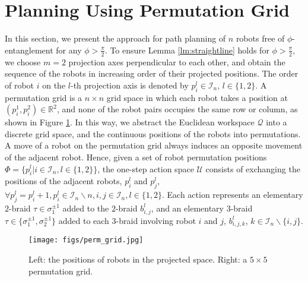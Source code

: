 \documentclass[conference]{IEEEtran}
\newcommand*{\myset}[1]{\mathcal{#1}} %
\newcommand*{\workspace}{\myset{Q}} %
\newcommand*{\rtwo}{\mathbb{R}^2}
\newcommand*{\rone}{\mathbb{R}}
\newcommand*{\btau}{\tau} %
\newcommand*{\bgen}{\sigma} %
\newcommand*{\word}{b} %
\newcommand*{\entangle}{\gamma} %
\newcommand*{\entangledef}{\phi} %
\newcommand*{\dummyl}{l}
\newcommand*{\permpos}{p}
\newcommand*{\permposset}{\Phi}
\newcommand*{\permactionset}{\myset{U}}
\begin{document}
\section{Planning Using Permutation Grid}\label{sec:planning}
In this section, we present the approach for path planning of $n$ robots free of $\entangledef$-entanglement for any $\entangledef>\frac{\pi}{2}$.
To ensure Lemma \ref{lm:straightline} holds for $\entangledef>\frac{\pi}{2}$, we choose $m=2$ projection axes perpendicular to each other, and obtain the sequence of the robots in increasing order of their projected positions.
The order of robot $i$ on the $\dummyl$-th projection axis is denoted by $\permpos_i^\dummyl\in\myset{I}_n$, $\dummyl\in\{1,2\}$.
A permutation grid is a $n\times n$ grid space in which each robot takes a position at $(\permpos_i^1,\permpos_i^2)\in\rtwo$,
and none of the robot pairs occupies the same row or column, as shown in Figure \ref{fig: permgrid}.
In this way, we abstract the Euclidean workspace $\workspace$ into a discrete grid space, and the continuous positions of the robots into permutations.
A move of a robot on the permutation grid always induces an opposite movement of the adjacent robot.
Hence, given a set of robot permutation positions $\permposset=\{\permpos_i^\dummyl|i\in\myset{I}_n,\dummyl\in\{1,2\}\}$, the one-step action space $\permactionset$ consists of exchanging the positions of the adjacent robots, $\permpos_i^\dummyl$ and $\permpos_j^\dummyl$, $\forall \permpos_j^\dummyl=\permpos_i^\dummyl+1, \permpos_i^\dummyl\in\myset{I}_n\backslash n, i,j\in\myset{I}_n, \dummyl\in\{1,2\}$.
Each action represents an elementary $2$-braid $\btau\in\bgen_1^{\pm1}$ added to the $2$-braid $\word_{i,j}^\dummyl$, and an elementary $3$-braid $\btau\in\{\bgen_1^{\pm1},\bgen_2^{\pm1}\}$ added to each $3$-braid involving robot $i$ and $j$, $\word_{i,j,k}^\dummyl$, $k\in\myset{I}_n\backslash\{i,j\}$.

\begin{figure}[!t]
\centering
\texttt{[image: figs/perm\_grid.jpg]}
\caption{\footnotesize Left: the positions of robots in the projected space. Right: a $5\times5$ permutation grid.}
\label{fig: permgrid}
\end{figure}
\end{document}
